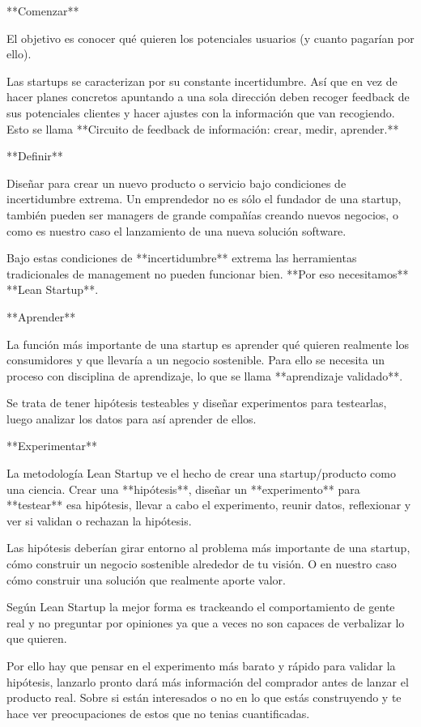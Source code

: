 \documentclass[12pt,twoside,titlepage]{report}
\begin{document}
**Comenzar**

El objetivo es conocer qué quieren los potenciales usuarios (y cuanto pagarían por ello). 

Las startups se caracterizan por su constante incertidumbre. Así que en vez de hacer planes concretos apuntando a una sola dirección deben recoger feedback de sus potenciales clientes y hacer ajustes con la información que van recogiendo. Esto se llama **Circuito de feedback de información: crear, medir, aprender.** 

**Definir**

Diseñar para crear un nuevo producto o servicio bajo condiciones de incertidumbre extrema. Un emprendedor no es sólo el fundador de una startup, también pueden ser managers de grande compañías creando nuevos negocios, o como es nuestro caso el lanzamiento de una nueva solución software.

Bajo estas condiciones de **incertidumbre** extrema las herramientas tradicionales de management no pueden funcionar bien. **Por eso necesitamos** **Lean Startup**.

**Aprender**

La función más importante de una startup es aprender qué quieren realmente los consumidores y que llevaría a un negocio sostenible. Para ello se necesita un proceso con disciplina de aprendizaje, lo que se llama **aprendizaje validado**. 

Se trata de tener hipótesis testeables y diseñar experimentos para testearlas, luego analizar los datos para así aprender de ellos.

**Experimentar**

La metodología Lean Startup ve el hecho de crear una startup/producto como una ciencia. Crear una **hipótesis**, diseñar un **experimento** para **testear** esa hipótesis, llevar a cabo el experimento, reunir datos, reflexionar y ver si validan o rechazan la hipótesis.

Las hipótesis deberían girar entorno al problema más importante de una startup, cómo construir un negocio sostenible alrededor de tu visión. O en nuestro caso cómo construir una solución que realmente aporte valor.

Según Lean Startup la mejor forma es trackeando el comportamiento de gente real y no preguntar por opiniones ya que a veces no son capaces de verbalizar lo que quieren.

Por ello hay que pensar en el experimento más barato y rápido para validar la hipótesis, lanzarlo pronto dará más información del comprador antes de lanzar el producto real. Sobre si están interesados o no en lo que estás construyendo y te hace ver preocupaciones de estos que no tenias cuantificadas.
\end{document}
